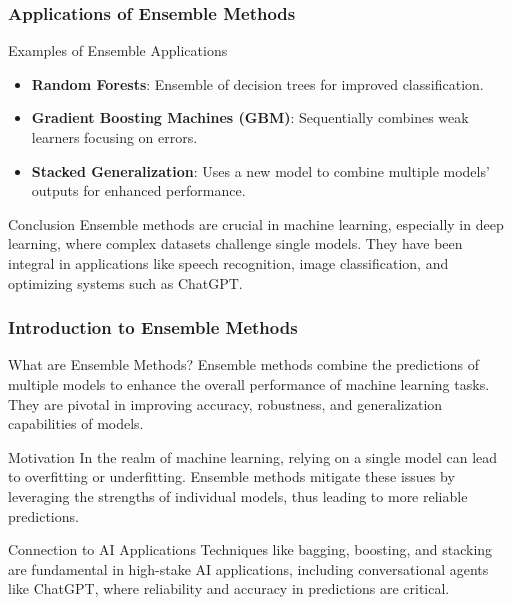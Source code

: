\documentclass[aspectratio=169]{beamer}
\begin{document}
\begin{frame}[fragile]
    \frametitle{Applications of Ensemble Methods}
    
    \begin{block}{Examples of Ensemble Applications}
        \begin{itemize}
            \item \textbf{Random Forests}: Ensemble of decision trees for improved classification.
            \item \textbf{Gradient Boosting Machines (GBM)}: Sequentially combines weak learners focusing on errors.
            \item \textbf{Stacked Generalization}: Uses a new model to combine multiple models' outputs for enhanced performance.
        \end{itemize}
    \end{block}
    
    \begin{block}{Conclusion}
        Ensemble methods are crucial in machine learning, especially in deep learning, where complex datasets challenge single models.
        They have been integral in applications like speech recognition, image classification, and optimizing systems such as ChatGPT.
    \end{block}
\end{frame}

\begin{frame}[fragile]
    \frametitle{Introduction to Ensemble Methods}
    \begin{block}{What are Ensemble Methods?}
        Ensemble methods combine the predictions of multiple models to enhance the overall performance of machine learning tasks. They are pivotal in improving accuracy, robustness, and generalization capabilities of models.
    \end{block}
    \begin{block}{Motivation}
        In the realm of machine learning, relying on a single model can lead to overfitting or underfitting. Ensemble methods mitigate these issues by leveraging the strengths of individual models, thus leading to more reliable predictions.
    \end{block}
    \begin{block}{Connection to AI Applications}
        Techniques like bagging, boosting, and stacking are fundamental in high-stake AI applications, including conversational agents like ChatGPT, where reliability and accuracy in predictions are critical.
    \end{block}
\end{frame}
\end{document}
